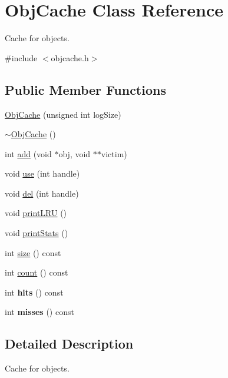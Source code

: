 \hypertarget{class_obj_cache}{}\section{Obj\+Cache Class Reference}
\label{class_obj_cache}


Cache for objects.  




{\ttfamily \#include $<$objcache.\+h$>$}

\subsection*{Public Member Functions}
\begin{DoxyCompactItemize}
\item 
\mbox{\hyperlink{class_obj_cache_a1818fcc2b39a5c54a6e2bd9b456b7ccb}{Obj\+Cache}} (unsigned int log\+Size)
\item 
\mbox{\hyperlink{class_obj_cache_ae2ea95b2c63b154dd0a068613ba06aff}{$\sim$\+Obj\+Cache}} ()
\item 
int \mbox{\hyperlink{class_obj_cache_affd025326493c40ac4e7f5b4c0c3ad9b}{add}} (void $\ast$obj, void $\ast$$\ast$victim)
\item 
void \mbox{\hyperlink{class_obj_cache_ac4d9eb810e8f6ca2fbd4cf058ff3fe0e}{use}} (int handle)
\item 
void \mbox{\hyperlink{class_obj_cache_a3ac1ae674ea8ff27e436c788f851d303}{del}} (int handle)
\item 
void \mbox{\hyperlink{class_obj_cache_aeea7452ce80751d3f8e76038dc44decc}{print\+L\+RU}} ()
\item 
void \mbox{\hyperlink{class_obj_cache_a3e4ded7d3342fb02d64bd8d39466a30a}{print\+Stats}} ()
\item 
int \mbox{\hyperlink{class_obj_cache_aea030caf627270a451507a3517584bbc}{size}} () const
\item 
int \mbox{\hyperlink{class_obj_cache_a134d58930129019d44886eda2bdec41d}{count}} () const
\item 
\mbox{\label{class_obj_cache_a5fd45d9b6ea78e9e62fedeee39269407}} 
int {\bfseries hits} () const
\item 
\mbox{\label{class_obj_cache_a66991bb77eb5a52680db3ecebc014fe4}} 
int {\bfseries misses} () const
\end{DoxyCompactItemize}


\subsection{Detailed Description}
Cache for objects. 

